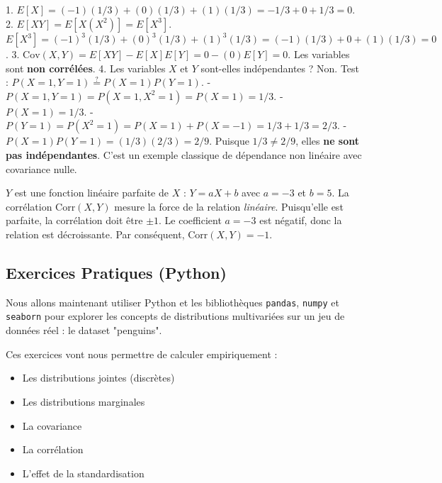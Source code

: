 \begin{correctionbox}
1.  $E[X] = (-1)(1/3) + (0)(1/3) + (1)(1/3) = -1/3 + 0 + 1/3 = 0$.
2.  $E[XY] = E[X(X^2)] = E[X^3]$.
    $E[X^3] = (-1)^3(1/3) + (0)^3(1/3) + (1)^3(1/3) = (-1)(1/3) + 0 + (1)(1/3) = 0$.
3.  $\text{Cov}(X,Y) = E[XY] - E[X]E[Y] = 0 - (0)E[Y] = 0$.
    Les variables sont \textbf{non corrélées}.
4.  Les variables $X$ et $Y$ sont-elles indépendantes ? Non.
    Test : $P(X=1, Y=1) \stackrel{?}{=} P(X=1)P(Y=1)$.
    - $P(X=1, Y=1) = P(X=1, X^2=1) = P(X=1) = 1/3$.
    - $P(X=1) = 1/3$.
    - $P(Y=1) = P(X^2=1) = P(X=1) + P(X=-1) = 1/3 + 1/3 = 2/3$.
    - $P(X=1)P(Y=1) = (1/3)(2/3) = 2/9$.
    Puisque $1/3 \neq 2/9$, elles \textbf{ne sont pas indépendantes}.
    C'est un exemple classique de dépendance non linéaire avec covariance nulle.
\end{correctionbox}

\begin{correctionbox}
$Y$ est une fonction linéaire parfaite de $X$ : $Y = aX + b$ avec $a=-3$ et $b=5$.
La corrélation $\text{Corr}(X,Y)$ mesure la force de la relation \textit{linéaire}. Puisqu'elle est parfaite, la corrélation doit être $\pm 1$.
Le coefficient $a = -3$ est négatif, donc la relation est décroissante.
Par conséquent, $\text{Corr}(X,Y) = -1$.
\end{correctionbox}

\subsection{Exercices Pratiques (Python)}

Nous allons maintenant utiliser Python et les bibliothèques \texttt{pandas}, \texttt{numpy} et \texttt{seaborn} pour explorer les concepts de distributions multivariées sur un jeu de données réel : le dataset "penguins".

Ces exercices vont nous permettre de calculer empiriquement :
\begin{itemize}
    \item Les distributions jointes (discrètes)
    \item Les distributions marginales
    \item La covariance
    \item La corrélation
    \item L'effet de la standardisation
\end{itemize}


